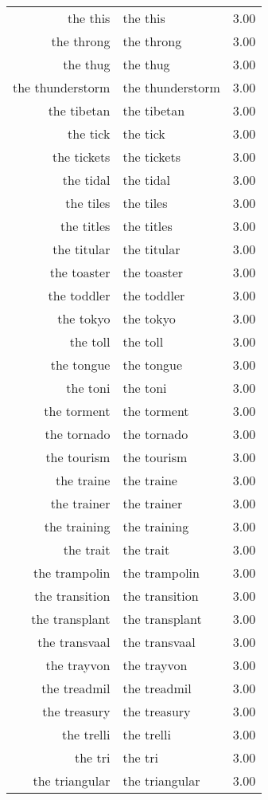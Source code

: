 \begin{table}[ht]
\begin{tabular}{rlr}
  the this & the this & 3.00 \\ 
  the throng & the throng & 3.00 \\ 
  the thug & the thug & 3.00 \\ 
  the thunderstorm & the thunderstorm & 3.00 \\ 
  the tibetan & the tibetan & 3.00 \\ 
  the tick & the tick & 3.00 \\ 
  the tickets & the tickets & 3.00 \\ 
  the tidal & the tidal & 3.00 \\ 
  the tiles & the tiles & 3.00 \\ 
  the titles & the titles & 3.00 \\ 
  the titular & the titular & 3.00 \\ 
  the toaster & the toaster & 3.00 \\ 
  the toddler & the toddler & 3.00 \\ 
  the tokyo & the tokyo & 3.00 \\ 
  the toll & the toll & 3.00 \\ 
  the tongue & the tongue & 3.00 \\ 
  the toni & the toni & 3.00 \\ 
  the torment & the torment & 3.00 \\ 
  the tornado & the tornado & 3.00 \\ 
  the tourism & the tourism & 3.00 \\ 
  the traine & the traine & 3.00 \\ 
  the trainer & the trainer & 3.00 \\ 
  the training & the training & 3.00 \\ 
  the trait & the trait & 3.00 \\ 
  the trampolin & the trampolin & 3.00 \\ 
  the transition & the transition & 3.00 \\ 
  the transplant & the transplant & 3.00 \\ 
  the transvaal & the transvaal & 3.00 \\ 
  the trayvon & the trayvon & 3.00 \\ 
  the treadmil & the treadmil & 3.00 \\ 
  the treasury & the treasury & 3.00 \\ 
  the trelli & the trelli & 3.00 \\ 
  the tri & the tri & 3.00 \\ 
  the triangular & the triangular & 3.00 \\ 

\end{tabular}
\end{table}
